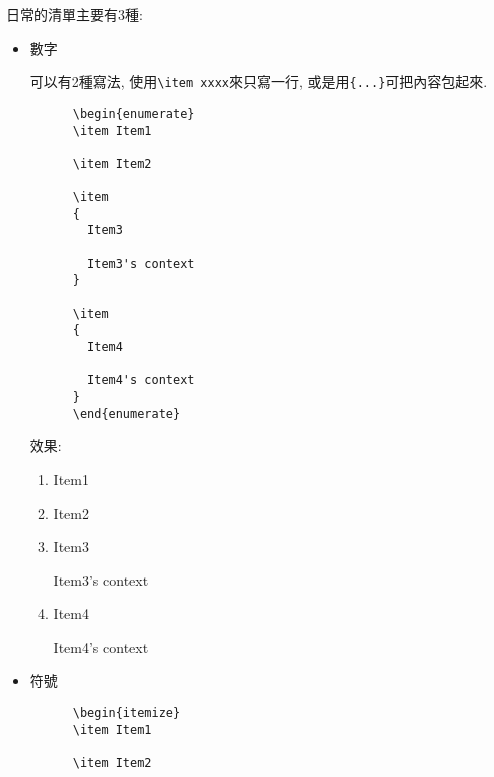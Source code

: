 \newpage
{}

  日常的清單主要有3種:

\begin{itemize}
  \item
  {
    數字

    可以有2種寫法, 使用\verb|\item xxxx|來只寫一行, 或是用\verb|{...}|可把內容包起來.
    \begin{framed}
    \begin{verbatim}
      \begin{enumerate}
      \item Item1

      \item Item2

      \item
      {
        Item3

        Item3's context
      }

      \item
      {
        Item4

        Item4's context
      }
      \end{enumerate}
    \end{verbatim}
    \end{framed}

    效果:
    \begin{enumerate}
      \item Item1

      \item Item2

      \item
      {
        Item3

        Item3's context
      }

      \item
      {
        Item4

        Item4's context
      }
    \end{enumerate}
  } %

  \newpage
  \item
  {
    符號

    \begin{framed}
    \begin{verbatim}
      \begin{itemize}
      \item Item1

      \item Item2


\end{verbatim}
\end{framed}}
\end{itemize}

